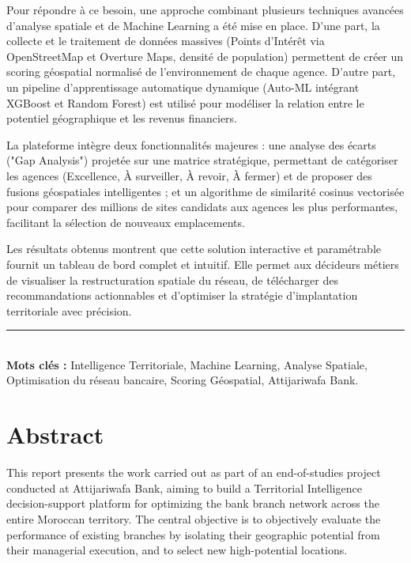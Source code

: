 \documentclass[11pt,a4paper,twoside]{report}
\begin{document}
Pour répondre à ce besoin, une approche combinant plusieurs techniques avancées d'analyse spatiale et de Machine Learning a été mise en place. D'une part, la collecte et le traitement de données massives (Points d'Intérêt via OpenStreetMap et Overture Maps, densité de population) permettent de créer un scoring géospatial normalisé de l'environnement de chaque agence. D'autre part, un pipeline d'apprentissage automatique dynamique (Auto-ML intégrant XGBoost et Random Forest) est utilisé pour modéliser la relation entre le potentiel géographique et les revenus financiers.

La plateforme intègre deux fonctionnalités majeures : une analyse des écarts ("Gap Analysis") projetée sur une matrice stratégique, permettant de catégoriser les agences (Excellence, À surveiller, À revoir, À fermer) et de proposer des fusions géospatiales intelligentes ; et un algorithme de similarité cosinus vectorisée pour comparer des millions de sites candidats aux agences les plus performantes, facilitant la sélection de nouveaux emplacements.

Les résultats obtenus montrent que cette solution interactive et paramétrable fournit un tableau de bord complet et intuitif. Elle permet aux décideurs métiers de visualiser la restructuration spatiale du réseau, de télécharger des recommandations actionnables et d'optimiser la stratégie d'implantation territoriale avec précision.

\vspace{\fill}
\noindent\rule{\textwidth}{0.4pt} \\
\textbf{Mots clés :} Intelligence Territoriale, Machine Learning, Analyse Spatiale, Optimisation du réseau bancaire, Scoring Géospatial, Attijariwafa Bank.

\newpage

\chapter*{Abstract}

\vspace{1cm}

This report presents the work carried out as part of an end-of-studies project conducted at Attijariwafa Bank, aiming to build a Territorial Intelligence decision-support platform for optimizing the bank branch network across the entire Moroccan territory. The central objective is to objectively evaluate the performance of existing branches by isolating their geographic potential from their managerial execution, and to select new high-potential locations.
\end{document}
